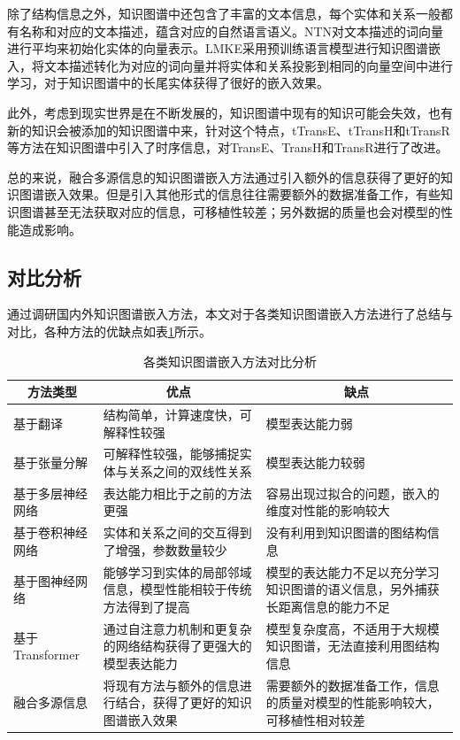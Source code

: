 除了结构信息之外，知识图谱中还包含了丰富的文本信息，每个实体和关系一般都有名称和对应的文本描述，蕴含对应的自然语言语义。NTN对文本描述的词向量进行平均来初始化实体的向量表示。LMKE采用预训练语言模型进行知识图谱嵌入，将文本描述转化为对应的词向量并将实体和关系投影到相同的向量空间中进行学习，对于知识图谱中的长尾实体获得了很好的嵌入效果。

此外，考虑到现实世界是在不断发展的，知识图谱中现有的知识可能会失效，也有新的知识会被添加的知识图谱中来，针对这个特点，tTransE、tTransH和tTransR等方法在知识图谱中引入了时序信息，对TransE、TransH和TransR进行了改进。

总的来说，融合多源信息的知识图谱嵌入方法通过引入额外的信息获得了更好的知识图谱嵌入效果。但是引入其他形式的信息往往需要额外的数据准备工作，有些知识图谱甚至无法获取对应的信息，可移植性较差；另外数据的质量也会对模型的性能造成影响。

\subsection{对比分析}
通过调研国内外知识图谱嵌入方法，本文对于各类知识图谱嵌入方法进行了总结与对比，各种方法的优缺点如表\ref{ComparativeAnalysis}所示。
\begin{table}[htbp]
  \caption{各类知识图谱嵌入方法对比分析}
  \label{ComparativeAnalysis}
  \centering
  \renewcommand\arraystretch{1.5}
  \begin{tabular}{lp{6cm}p{5cm}}
    \toprule
    \multicolumn{1}{c}{\textbf{方法类型}} & \multicolumn{1}{c}{\textbf{优点}} & \multicolumn{1}{c}{\textbf{缺点}}\\
    \midrule
    基于翻译 & 结构简单，计算速度快，可解释性较强& 模型表达能力弱\\
    基于张量分解 & 可解释性较强，能够捕捉实体与关系之间的双线性关系 & 模型表达能力较弱\\
    基于多层神经网络 & 表达能力相比于之前的方法更强 & 容易出现过拟合的问题，嵌入的维度对性能的影响较大\\
    基于卷积神经网络 & 实体和关系之间的交互得到了增强，参数数量较少&没有利用到知识图谱的图结构信息\\
    基于图神经网络 & 能够学习到实体的局部邻域信息，模型性能相较于传统方法得到了提高 & 模型的表达能力不足以充分学习知识图谱的语义信息，另外捕获长距离信息的能力不足\\
    基于Transformer &通过自注意力机制和更复杂的网络结构获得了更强大的模型表达能力 & 模型复杂度高，不适用于大规模知识图谱，无法直接利用图结构信息\\
    融合多源信息 & 将现有方法与额外的信息进行结合，获得了更好的知识图谱嵌入效果 & 需要额外的数据准备工作，信息的质量对模型的性能影响较大，可移植性相对较差\\
    \bottomrule
  \end{tabular}
\end{table}

